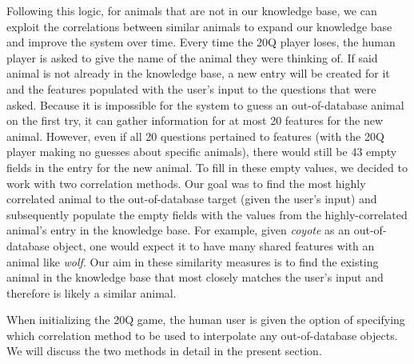 \documentclass[11pt,a4paper]{article}
\begin{document}
Following this logic, for animals that are not in our knowledge base, we can exploit the correlations between similar animals to expand our knowledge base and improve the system over time.
Every time the 20Q player loses, the human player is asked to give the name of the animal they were thinking of. 
If said animal is not already in the knowledge base, a new entry will be created for it and the features populated with the user's input to the questions that were asked. 
Because it is impossible for the system to guess an out-of-database animal on the first try, it can gather information for at most 20 features for the new animal. 
However, even if all 20 questions pertained to features (with the 20Q player making no guesses about specific animals), there would still be 43 empty fields in the entry for the new animal. 
To fill in these empty values, we decided to work with two correlation methods. 
Our goal was to find the most highly correlated animal to the out-of-database target (given the user's input) and subsequently populate the empty fields with the values from the highly-correlated animal's entry in the knowledge base. 
For example, given \textit{coyote} as an out-of-database object, one would expect it to have many shared features with an animal like \textit{wolf}. 
Our aim in these similarity measures is to find the existing animal in the knowledge base that most closely matches the user's input and therefore is likely a similar animal.

When initializing the 20Q game, the human user is given the option of specifying which correlation method to be used to interpolate any out-of-database objects. We will discuss the two methods in detail in the present section.
\end{document}
